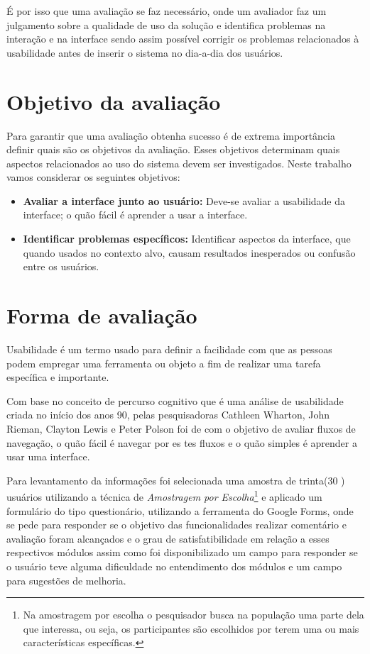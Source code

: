 \documentclass[12pt, a4paper]{report}
\begin{document}
É por isso que uma avaliação se faz necessário, onde um  avaliador faz um julgamento sobre a qualidade de uso da solução e identifica problemas na interação e na interface sendo assim possível corrigir os problemas relacionados à usabilidade antes de inserir o sistema no dia-a-dia dos usuários.

\section{Objetivo da avaliação }
Para garantir que uma avaliação obtenha sucesso é de extrema importância definir quais são os objetivos da avaliação. Esses objetivos determinam quais aspectos relacionados ao uso do sistema devem ser investigados. Neste trabalho vamos considerar os seguintes objetivos:
\begin{itemize}
 
 \item{\textbf{Avaliar a interface junto ao usuário:}} Deve-se avaliar a usabilidade da interface; o quão fácil é aprender a usar a interface.
 \item{\textbf{Identificar problemas específicos:}} Identificar aspectos da interface, que quando usados no contexto alvo, causam resultados inesperados ou confusão entre os usuários.
\end{itemize}

\section{Forma de avaliação}

Usabilidade é um termo usado para definir a facilidade com que as pessoas podem empregar uma ferramenta ou objeto a fim de realizar uma tarefa específica e importante. 

Com base no conceito de percurso cognitivo que é uma análise de usabilidade criada  no início dos anos 90, pelas pesquisadoras Cathleen Wharton, John Rieman, Clayton Lewis e Peter Polson foi de com o objetivo de avaliar fluxos de navegação, o quão fácil é navegar por es tes fluxos e o quão simples é aprender a usar uma interface.

Para levantamento da informações foi selecionada uma amostra de trinta(30 ) usuários utilizando a técnica de \textit{Amostragem por Escolha}\footnote{ Na amostragem por escolha o pesquisador busca na população uma parte dela que interessa, ou seja, os participantes são escolhidos por terem uma ou mais características específicas.}
e aplicado um formulário do tipo questionário, utilizando a ferramenta do Google Forms, onde se pede para responder se o objetivo das funcionalidades realizar comentário e avaliação foram alcançados e o  grau de satisfatibilidade em relação a esses respectivos módulos assim como foi disponibilizado um campo para responder se o usuário teve alguma dificuldade no entendimento dos módulos e um campo para sugestões de melhoria.
\end{document}
